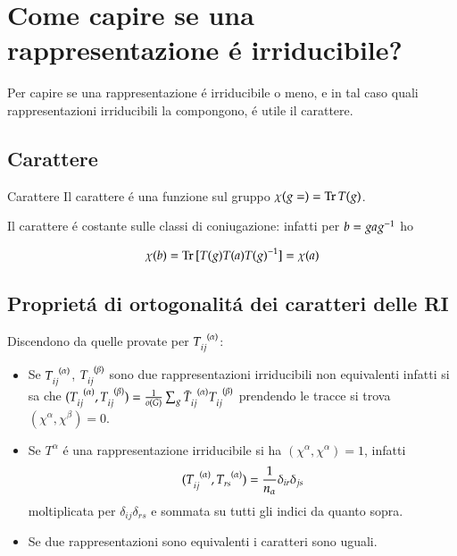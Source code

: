 \documentclass[oneside,12pt]{memoir}
\begin{document}
\section{Come capire se una rappresentazione \'e irriducibile?}

Per capire se una rappresentazione \'e irriducibile o meno, e in tal caso quali rappresentazioni irriducibili la compongono, \'e utile il carattere.

\subsection{Carattere}

\begin{definition}{Carattere}
Il carattere \'e una funzione sul gruppo $\chi(g=)=\operatorname{Tr}{T(g)}$.
\end{definition}

Il carattere \'e costante sulle classi di coniugazione: infatti per $b=ga{{g}^{-1}}$ ho

\begin{equation*}
\chi(b)=\operatorname{Tr}{[T(g)T(a){{T(g)}^{-1}}]}=\chi(a)
\end{equation*}

\subsection{Propriet\'a di ortogonalit\'a dei caratteri delle RI}

Discendono da quelle provate per $T\indices{_i_j^{(\alpha)}}$:
\begin{itemize}
\item Se $\rapreg{ij}{\alpha}$, $\rapreg{ij}{\beta}$ sono due rappresentazioni irriducibili non equivalenti infatti si sa che $(\rapreg{ij}{\alpha},\rapreg{ij}{\beta})=\frac{1}{o(G)}\sum_g\rapregb{ij}{\alpha}\rapreg{ij}{\beta}$ prendendo le tracce si trova $(\chi^{\alpha},\chi^{\beta})=0$.
\item Se $T^{\alpha}$ \'e una rappresentazione irriducibile si ha $(\chi^{\alpha}
,\chi^{\alpha})=1$, infatti
\begin{equation*}
(\rapreg{ij}{\alpha},\rapreg{rs}{\alpha})=\frac{1}{n_{\alpha}}\delta_{ir}\delta_{js}
\end{equation*}
moltiplicata per $\delta_{ij}\delta_{rs}$ e sommata su tutti gli indici da quanto sopra.
\item Se due rappresentazioni sono equivalenti i caratteri sono uguali.
\end{itemize}
\end{document}
